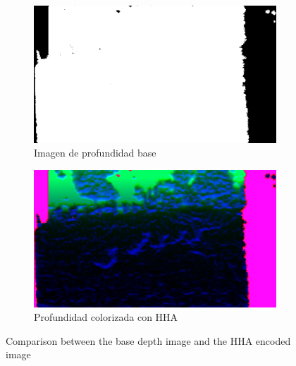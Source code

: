 \documentclass[12pt,a4paper]{report}
\begin{document}
\begin{figure}
    \centering
    \begin{subfigure}{0.45\textwidth}
        \centering
        \includegraphics[width=\textwidth]{media/data/depth_gueese.png}
        \caption{Imagen de profundidad base}
    \end{subfigure}
    \hfill
    \begin{subfigure}{0.45\textwidth}
        \centering
        \includegraphics[width=\textwidth]{media/data/hha_gueese.png}
        \caption{Profundidad colorizada con HHA}
    \end{subfigure}
    \caption{Comparison between the base depth image and the HHA encoded image}
    \label{fig:depth-hha-comparison}
\end{figure}
\end{document}
